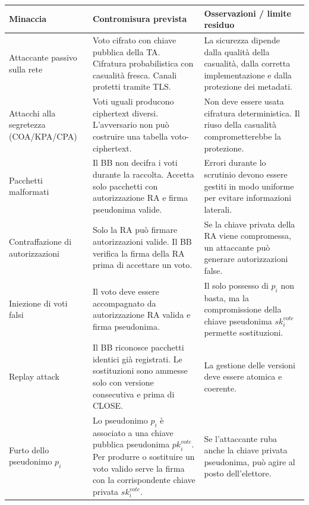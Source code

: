 \documentclass[12pt,a4paper]{article}
\newcommand{\pk}{\mathit{pk}}
\newcommand{\sk}{\mathit{sk}}
\begin{document}
\begin{small}
\begin{longtable}{>{\raggedright}p{2.8cm} p{4.8cm} p{5.2cm}}
\toprule
\textbf{Minaccia} & \textbf{Contromisura prevista} & \textbf{Osservazioni / limite residuo} \\
\midrule
\endhead

Attaccante passivo sulla rete &
Voto cifrato con chiave pubblica della TA. Cifratura probabilistica con casualit\`a fresca. Canali protetti tramite TLS. &
La sicurezza dipende dalla qualit\`a della casualit\`a, dalla corretta implementazione e dalla protezione dei metadati. \\
\midrule

Attacchi alla segretezza (COA/KPA/CPA) &
Voti uguali producono ciphertext diversi. L'avversario non pu\`o costruire una tabella voto-ciphertext. &
Non deve essere usata cifratura deterministica. Il riuso della casualit\`a comprometterebbe la protezione. \\
\midrule

Pacchetti malformati &
Il BB non decifra i voti durante la raccolta. Accetta solo pacchetti con autorizzazione RA e firma pseudonima valide. &
Errori durante lo scrutinio devono essere gestiti in modo uniforme per evitare informazioni laterali. \\
\midrule

Contraffazione di autorizzazioni &
Solo la RA pu\`o firmare autorizzazioni valide. Il BB verifica la firma della RA prima di accettare un voto. &
Se la chiave privata della RA viene compromessa, un attaccante pu\`o generare autorizzazioni false. \\
\midrule

Iniezione di voti falsi &
Il voto deve essere accompagnato da autorizzazione RA valida e firma pseudonima. &
Il solo possesso di $p_i$ non basta, ma la compromissione della chiave pseudonima $\sk_i^{\mathit{vote}}$ permette sostituzioni. \\
\midrule

Replay attack &
Il BB riconosce pacchetti identici gi\`a registrati. Le sostituzioni sono ammesse solo con versione consecutiva e prima di CLOSE. &
La gestione delle versioni deve essere atomica e coerente. \\
\midrule

Furto dello pseudonimo $p_i$ &
Lo pseudonimo $p_i$ \`e associato a una chiave pubblica pseudonima $\pk_i^{\mathit{vote}}$. Per produrre o sostituire un voto valido serve la firma con la corrispondente chiave privata $\sk_i^{\mathit{vote}}$. &
Se l'attaccante ruba anche la chiave privata pseudonima, pu\`o agire al posto dell'elettore. \\
\midrule


\end{longtable}
\end{small}
\end{document}
